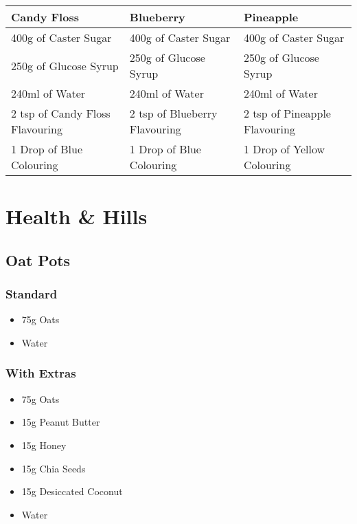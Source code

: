 \documentclass[11pt, english]{article}
\begin{document}
	\begin{table}[h]
	        \scriptsize
	\begin{center}
	\begin{tabular}{p{4.5cm}p{4.5cm}p{4.5cm}}
	        \hline
	        \textbf{Candy Floss} & \textbf{Blueberry} & \textbf{Pineapple}\\
	        \hline
	        400g of Caster Sugar & 400g of Caster Sugar & 400g of Caster Sugar\\
	        250g of Glucose Syrup & 250g of Glucose Syrup & 250g of Glucose Syrup\\
	        240ml of Water & 240ml of Water & 240ml of Water\\
	        2 tsp of Candy Floss Flavouring & 2 tsp of Blueberry Flavouring & 2 tsp of Pineapple Flavouring\\
	        1 Drop of Blue Colouring & 1 Drop of Blue Colouring & 1 Drop of Yellow Colouring\\
	        \hline
	\end{tabular}
	\end{center}
	\end{table}

\newpage

\section{Health \& Hills}

	\subsection{Oat Pots}

		\subsubsection*{Standard}

	\begin{itemize}
	\setlength\itemsep{0cm}
		\item 75g Oats
		\item Water
	\end{itemize}

		\subsubsection*{With Extras}

	\begin{itemize}
	\setlength\itemsep{0cm}
		\item 75g Oats
		\item 15g Peanut Butter
		\item 15g Honey
		\item 15g Chia Seeds
		\item 15g Desiccated Coconut
		\item Water
	\end{itemize}
\end{document}
